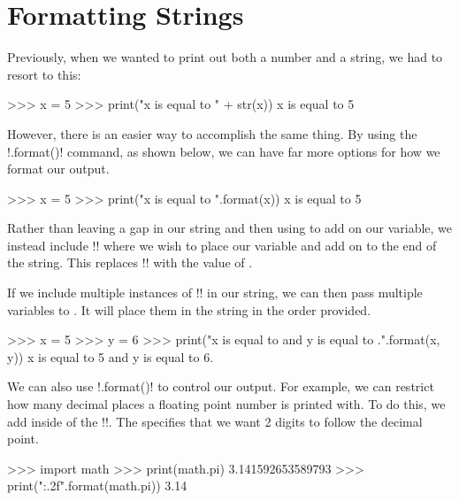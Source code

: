 \documentclass[11pt]{cselabheader}
\begin{document}
\pagebreak
\section{Formatting Strings}

Previously, when we wanted to print out both a number and a string, we
had to resort to this:

\begin{pyconcode}
>>> x = 5
>>> print("x is equal to " + str(x))
x is equal to 5
\end{pyconcode}

However, there is an easier way to accomplish the same thing. By using the
\pythoninline!.format()! command, as shown below, we can have far more options for
how we format our output.

\begin{pyconcode}
>>> x = 5
>>> print("x is equal to {}".format(x))
x is equal to 5
\end{pyconcode}

Rather than leaving a gap in our string and then using \pythoninline{+} to add on
our variable, we instead include \pythoninline!{}! where we wish to place our
variable and add on  to the end of the string. This
replaces \pythoninline!{}! with the value of .

If we include multiple instances of \pythoninline!{}! in our string, we can then
pass multiple variables to . It will place them in the
string in the order provided.

\begin{pyconcode}
>>> x = 5
>>> y = 6
>>> print("x is equal to {} and y is equal to {}.".format(x, y))
x is equal to 5 and y is equal to 6.
\end{pyconcode}

We can also use \pythoninline!.format()! to control our output. For example, we can
restrict how many decimal places a floating point number is printed with. To do
this, we add  inside of the \pythoninline!{}!. The 
specifies that we want 2 digits to follow the decimal point. 

\begin{pyconcode}
>>> import math
>>> print(math.pi)
3.141592653589793
>>> print("{:.2f}".format(math.pi))
3.14
\end{pyconcode}
\end{document}
